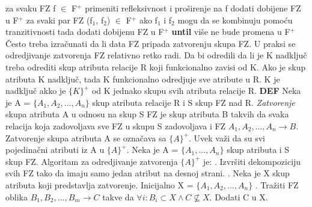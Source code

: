 \documentclass{article}
\begin{document}
\hspace*{0.8cm}za svaku FZ f $\in$ F$^+$ \newline
\hspace*{1.4cm}primeniti refleksivnost i proširenje na f \newline
\hspace*{1.4cm}dodati dobijene FZ u F$^+$ \newline
\hspace*{0.8cm}za svaki par FZ (f$_1$, f$_2$) $\in$ F$^+$ \newline
\hspace*{1.4cm}ako f$_1$ i f$_2$ mogu da se kombinuju pomoću
tranzitivnosti \newline
\hspace*{1.8cm}tada dodati dobijenu FZ u F$^+$ \newline
\hspace*{0.4cm}\textbf{until} više ne bude promena u F$^+$
\vspace{0.2cm}\newline
Često treba izračunati da li data FZ pripada zatvorenju skupa FZ. U
praksi se odredjivanje zatvorenja FZ relativno retko radi. Da bi
odredili da li je K nadključ treba odrediti skup atributa relacije R
koji funkcionalno zavisi od K. Ako je skup atributa K nadključ, tada
K funkcionalno odredjuje sve atribute u R. K je nadključ akko je
$\{K\}^+$ od K jednako skupu svih atributa relacije R. 
\vspace{0.1cm} \newline
\textbf{DEF} Neka je A = $\{A_1, A_2,...,A_n\}$ skup atributa
relacije R i S skup FZ nad R. \textit{Zatvorenje} skupa atributa A u
odnosu na skup S FZ je skup atributa B takvih da svaka relacija koja
zadovoljava sve FZ u skupu S zadovoljava i FZ $A_1,A_2,...,A_n
\rightarrow B$.
\newline
Zatvorenje skupa atributa A se označava sa $\{A\}^+$. Uvek važi da su
svi pojedinačni atributi iz A u $\{A\}^+$.
\vspace{0.1cm} \newline
Neka je A = $\{A_1,...,A_n\}$ skup atributa i S skup FZ. Algoritam za
odredjivanje zatvorenja $\{A\}^+$ je: . Izvršiti dekompoziciju svih FZ tako da imaju samo jedan atribut na
desnoj strani. . Neka je X skup atributa koji predstavlja zatvorenje. Inicijalno X
= $\{A_1,A_2,...,A_n\}$ . Tražiti FZ oblika $B_1,B_2,...,B_m \rightarrow C$ takve da
$\forall i:B_i \subset X \wedge C \nsubseteq X$. Dodati C u X.
\end{document}
